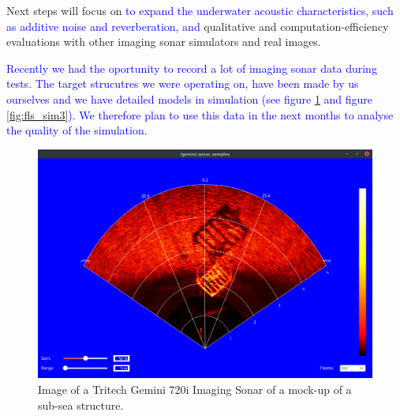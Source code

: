\documentclass[final,5p,times]{elsarticle}
\begin{document}
Next steps will
focus on \textcolor{blue}{to expand the underwater acoustic characteristics, such as additive
noise and reverberation, and} qualitative and computation\hyp{}efficiency
evaluations with other imaging sonar simulators and real images.

\textcolor{blue}{Recently we had the oportunity to record a lot of imaging sonar data during tests. The
target strucutres we were operating on, have been made by us ourselves and we have detailed models in
simulation (see figure \ref{fig:real_sonar} and figure \ref{fig:fls_sim3}). We therefore plan to use this data
in the  next months to analyse the quality of the simulation.}

\begin{figure}[t]
    \includegraphics[width=\columnwidth]{figs/real_ssiv_03}
    \centering
    \captionsetup{justification=centering}
    \caption{Image of a Tritech Gemini 720i Imaging Sonar of a mock-up of a sub-sea structure.}
    \label{fig:real_sonar}
\end{figure}











\end{document}
